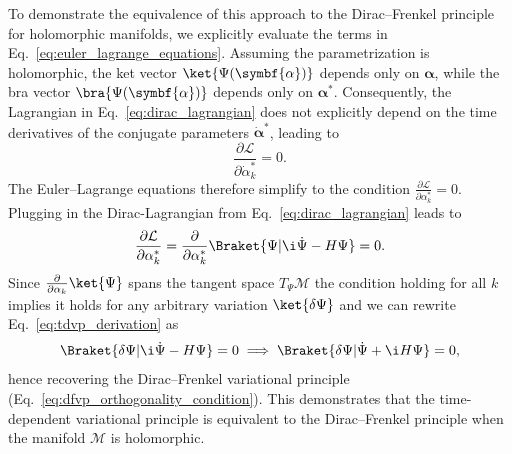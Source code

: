 To demonstrate the equivalence of this approach to the Dirac--Frenkel principle for holomorphic manifolds, we explicitly evaluate the terms in Eq.~\eqref{eq:euler_lagrange_equations}. Assuming the parametrization is holomorphic, the ket vector $\ket{\Psi(\symbf{\alpha})}$ depends only on $\symbf{\alpha}$, while the bra vector $\bra{\Psi(\symbf{\alpha})}$ depends only on $\symbf{\alpha}^\ast$. Consequently, the Lagrangian in Eq.~\eqref{eq:dirac_lagrangian} does not explicitly depend on the time derivatives of the conjugate parameters $\dot{\symbf{\alpha}}^\ast$, leading to
\begin{equation}
\frac{\partial\mathcal{L}}{\partial\dot{\alpha}_k^\ast}=0.
\end{equation}
The Euler--Lagrange equations therefore simplify to the condition $\frac{\partial\mathcal{L}}{\partial\alpha_k^\ast}=0$. Plugging in the Dirac-Lagrangian from Eq.~\eqref{eq:dirac_lagrangian} leads to
\begin{equation}\label{eq:tdvp_derivation}
\frac{\partial\mathcal{L}}{\partial\alpha_k^\ast}=\frac{\partial}{\partial\alpha_k^\ast}\Braket{\Psi|\i\dot\Psi-H\Psi}=0.
\end{equation}
Since $\frac{\partial}{\partial\alpha_k}\ket{\Psi}$ spans the tangent space $T_{\Psi}\mathcal{M}$ the condition holding for all $k$ implies it holds for any arbitrary variation $\ket{\delta\Psi}$ and we can rewrite Eq.~\eqref{eq:tdvp_derivation} as
\begin{equation}
\Braket{\delta\Psi|\i\dot\Psi-H\Psi}=0\implies\Braket{\delta\Psi|\dot\Psi+\i H\Psi}=0,
\end{equation}
hence recovering the Dirac--Frenkel variational principle (Eq.~\eqref{eq:dfvp_orthogonality_condition}). This demonstrates that the time-dependent variational principle is equivalent to the Dirac--Frenkel principle when the manifold $\mathcal{M}$ is holomorphic.
